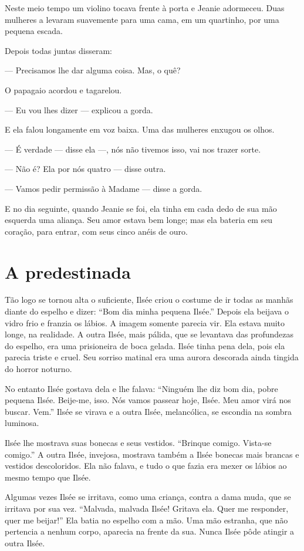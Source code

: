 Neste meio tempo um violino tocava frente à porta e Jeanie adormeceu.
Duas mulheres a levaram suavemente para uma cama, em um quartinho, por uma
pequena escada.

Depois todas juntas disseram:

--- Precisamos lhe dar alguma coisa. Mas, o quê?

O papagaio acordou e tagarelou.

--- Eu vou lhes dizer --- explicou a gorda.

E ela falou longamente em voz baixa. Uma das mulheres enxugou os olhos.

--- É verdade --- disse ela ---, nós não tivemos isso, vai nos trazer sorte.

--- Não é? Ela por nós quatro --- disse outra.

--- Vamos pedir permissão à Madame --- disse a gorda.

E no dia seguinte, quando Jeanie se foi, ela tinha em cada dedo de sua
mão esquerda uma aliança. Seu amor estava bem longe; mas ela bateria em
seu coração, para entrar, com seus cinco anéis de ouro.

\section*{A predestinada}

Tão logo se tornou alta o suficiente, Ilsée criou o costume de ir todas
as manhãs diante do espelho e dizer: “Bom dia minha pequena Ilsée.” Depois
ela beijava o vidro frio e franzia os lábios. A imagem somente parecia
vir. Ela estava muito longe, na realidade. A outra Ilsée, mais pálida, que
se levantava das profundezas do espelho, era uma prisioneira de boca
gelada. Ilsée tinha pena dela, pois ela parecia triste e cruel. Seu
sorriso matinal era uma aurora descorada ainda tingida do horror noturno.

No entanto Ilsée gostava dela e lhe falava: “Ninguém lhe diz bom dia,
pobre pequena Ilsée. Beije-me, isso. Nós vamos passear hoje, Ilsée. Meu
amor virá nos buscar. Vem.” Ilsée se virava e a outra Ilsée, melancólica,
se escondia na sombra luminosa.

Ilsée lhe mostrava suas bonecas e seus vestidos. “Brinque comigo.
Vista-se comigo.” A outra Ilsée, invejosa, mostrava também a Ilsée bonecas
mais brancas e vestidos descoloridos. Ela não falava, e tudo o que fazia
era mexer os lábios ao mesmo tempo que Ilsée.

Algumas vezes Ilsée se irritava, como uma criança, contra a dama muda,
que se irritava por sua vez. “Malvada, malvada Ilsée! Gritava ela. Quer me
responder, quer me beijar!” Ela batia no espelho com a mão. Uma mão estranha, que
não pertencia a nenhum corpo, aparecia na frente da sua. Nunca Ilsée pôde
atingir a outra Ilsée.

